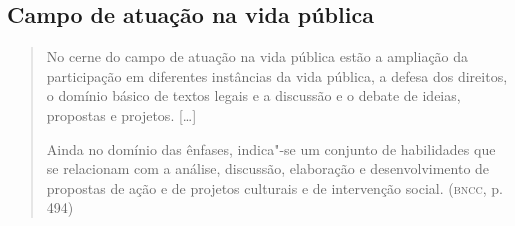 \documentclass[11pt]{extarticle}
\begin{document}
\subsection{Campo de atuação na vida pública}

\begin{quote}
No cerne do campo de atuação na vida pública estão a ampliação da
participação em diferentes instâncias da vida pública, a defesa dos
direitos, o domínio básico de textos legais e a discussão e o debate de
ideias, propostas e projetos. {[}\ldots{}{]}

Ainda no domínio das ênfases, indica"-se um conjunto de habilidades que
se relacionam com a análise, discussão, elaboração e desenvolvimento de
propostas de ação e de projetos culturais e de intervenção social.
(\textsc{bncc}, p. 494)
\end{quote}
\end{document}
